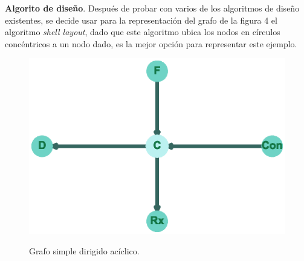\documentclass{article}
\begin{document}
\textbf{Algorito de diseño}.\linebreak
Después de probar con varios de los algoritmos de diseño existentes, se decide usar para la representación del grafo de la figura 4 el algoritmo \textit{shell layout}, dado que este algoritmo ubica los nodos en círculos concéntricos a un nodo dado, es la mejor opción para representar este ejemplo.



\begin{center}

\end{center}

\begin{figure}[h]
\begin{center}
\includegraphics[scale=0.7]{Graf4_shell_layout.eps}\\
\caption{Grafo simple dirigido acíclico.}
\end{center}
\end{figure}
\newpage
\end{document}
